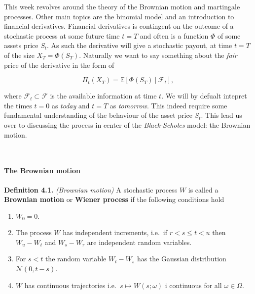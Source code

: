 \documentclass[
]{article}
\providecommand{\tightlist}{%
  \setlength{\itemsep}{0pt}\setlength{\parskip}{0pt}}
\begin{document}
This week revolves around the theory of the Brownian motion and
martingale processes. Other main topics are the binomial model and an
introduction to financial derivatives. Financial derivatives is
contingent on the outcome of a stochastic process at some future time
\(t=T\) and often is a function \(\Phi\) of some assets price \(S_t\).
As such the derivative will give a stochastic payout, at time \(t=T\) of
the size \(X_T=\Phi(S_T)\). Naturally we want to say something about the
\emph{fair} price of the derivative in the form of

\[\Pi_t(X_T)=\mathbb{E}\left[\Phi(S_T)\ \vert\ \mathcal{F}_t\right],\]

where \(\mathcal{F}_t\subset\mathcal{F}\) is the available information
at time \(t\). We will by defualt intepret the times \(t=0\) as
\emph{today} and \(t=T\) as \emph{tomorrow}. This indeed require some
fundamental understanding of the behaviour of the asset price \(S_t\).
This lead us over to discussing the process in center of the
\emph{Black-Scholes} model: the Brownian motion.

~

\hypertarget{the-brownian-motion}{%
\paragraph{The Brownian motion}\label{the-brownian-motion}}

\textbf{Definition 4.1.} \emph{(Brownian motion)} A stochastic process
\(W\) is called a \textbf{Brownian motion} or \textbf{Wiener process} if
the following conditions hold

\begin{enumerate}
\def\labelenumi{\arabic{enumi}.}
\tightlist
\item
  \(W_0=0\).
\item
  The process \(W\) has independent increments, i.e.~if \(r<s\le t< u\)
  then \(W_u-W_t\) and \(W_s-W_r\) are independent random variables.
\item
  For \(s<t\) the random variable \(W_t-W_s\) has the Gaussian
  distribution \(\mathcal{N}(0,t-s)\).
\item
  \(W\) has continuous trajectories i.e.~\(s\mapsto W(s;\omega)\) i
  continuous for all \(\omega \in\Omega\).
\end{enumerate}
\end{document}
